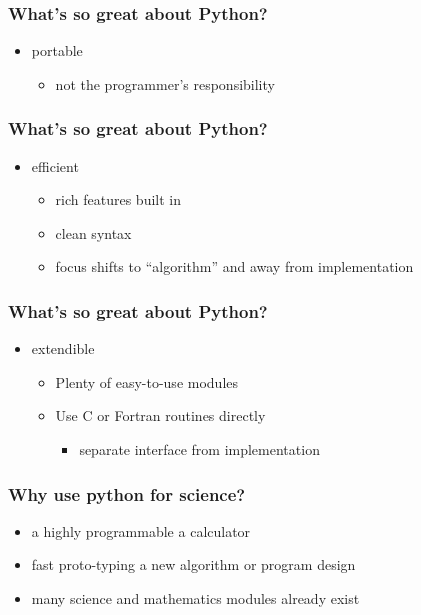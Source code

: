 \documentclass[xcolor=table,10pt,final]{beamer}
\begin{document}
\begin{frame}
  \frametitle{What's so great about Python?}
  \begin{itemize}
    \item portable
      \begin{itemize}
        \item not the programmer's responsibility
      \end{itemize}
  \end{itemize}
\end{frame}
\begin{frame}
  \frametitle{What's so great about Python?}
  \begin{itemize}
    \item efficient
      \begin{itemize}
        \item rich features built in
        \item clean syntax
        \item focus shifts to ``algorithm'' and away from implementation
      \end{itemize}
  \end{itemize}
\end{frame}
\begin{frame}
  \frametitle{What's so great about Python?}
  \begin{itemize}
    \item extendible
      \begin{itemize}
        \item Plenty of easy-to-use modules
        \item Use C or Fortran routines directly
          \begin{itemize}
            \item separate interface from implementation
          \end{itemize}
      \end{itemize}
  \end{itemize}
\end{frame}

\begin{frame}
  \frametitle{Why use python for science?}
  \begin{itemize}
    \item a highly programmable a calculator
    \item fast proto-typing a new algorithm or program design
    \item many science and mathematics modules already exist
  \end{itemize}
\end{frame}
\end{document}

